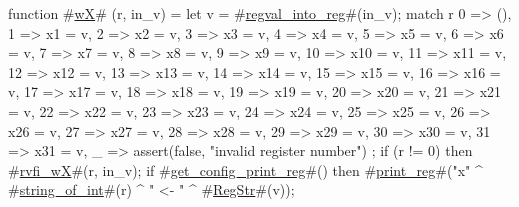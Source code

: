 function #\hyperref[sailRISCVzwX]{wX}# (r, in_v) = {
  let v = #\hyperref[sailRISCVzregvalzyintozyreg]{regval\_into\_reg}#(in_v);
  match r {
    0  => (),
    1  => x1 = v,
    2  => x2 = v,
    3  => x3 = v,
    4  => x4 = v,
    5  => x5 = v,
    6  => x6 = v,
    7  => x7 = v,
    8  => x8 = v,
    9  => x9 = v,
    10 => x10 = v,
    11 => x11 = v,
    12 => x12 = v,
    13 => x13 = v,
    14 => x14 = v,
    15 => x15 = v,
    16 => x16 = v,
    17 => x17 = v,
    18 => x18 = v,
    19 => x19 = v,
    20 => x20 = v,
    21 => x21 = v,
    22 => x22 = v,
    23 => x23 = v,
    24 => x24 = v,
    25 => x25 = v,
    26 => x26 = v,
    27 => x27 = v,
    28 => x28 = v,
    29 => x29 = v,
    30 => x30 = v,
    31 => x31 = v,
    _  => assert(false, "invalid register number")
  };
  if (r != 0) then {
     #\hyperref[sailRISCVzrvfizywX]{rvfi\_wX}#(r, in_v);
     if   #\hyperref[sailRISCVzgetzyconfigzyprintzyreg]{get\_config\_print\_reg}#()
     then #\hyperref[sailRISCVzprintzyreg]{print\_reg}#("x" ^ #\hyperref[sailRISCVzstringzyofzyint]{string\_of\_int}#(r) ^ " <- " ^ #\hyperref[sailRISCVzRegStr]{RegStr}#(v));
  }
}
